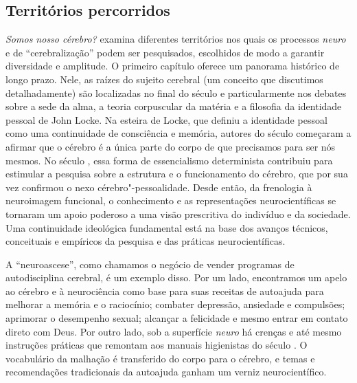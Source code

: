 \subsection{Territórios percorridos}

\emph{Somos nosso cérebro?} examina diferentes territórios nos quais os
processos \emph{neuro} e de ``cerebralização'' podem ser pesquisados,
escolhidos de modo a garantir diversidade e amplitude. O primeiro
capítulo oferece um panorama histórico de longo prazo. Nele, as raízes
do sujeito cerebral (um conceito que discutimos detalhadamente) são
localizadas no final do século  e particularmente nos debates sobre
a sede da alma, a teoria corpuscular da matéria e a filosofia da
identidade pessoal de John Locke. Na esteira de Locke, que definiu a
identidade pessoal como uma continuidade de consciência e memória,
autores do século  começaram a afirmar que o cérebro é a única
parte do corpo de que precisamos para ser nós mesmos. No século ,
essa forma de essencialismo determinista contribuiu para estimular a
pesquisa sobre a estrutura e o funcionamento do cérebro, que por sua vez
confirmou o nexo cérebro"-pessoalidade. Desde então, da frenologia à
neuroimagem funcional, o conhecimento e as representações
neurocientíficas se tornaram um apoio poderoso a uma visão prescritiva
do indivíduo e da sociedade. Uma continuidade ideológica fundamental
está na base dos avanços técnicos, conceituais e empíricos da pesquisa e
das práticas neurocientíficas.

A ``neuroascese'', como chamamos o negócio de vender programas de
autodisciplina cerebral, é um exemplo disso. Por um lado, encontramos um
apelo ao cérebro e à neurociência como base para suas receitas de
autoajuda para melhorar a memória e o raciocínio; combater depressão,
ansiedade e compulsões; aprimorar o desempenho sexual; alcançar a
felicidade e mesmo entrar em contato direto com Deus. Por outro lado,
sob a superfície \emph{neuro} há crenças e até mesmo instruções práticas
que remontam aos manuais higienistas do século . O vocabulário da
malhação é transferido do corpo para o cérebro, e temas e recomendações
tradicionais da autoajuda ganham um verniz neurocientífico.

